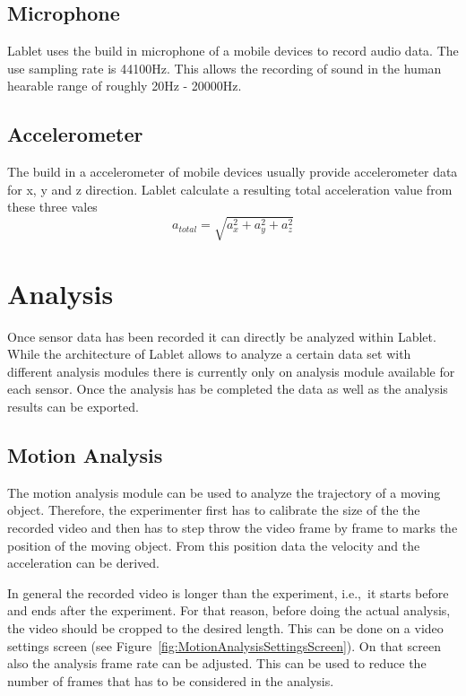 \documentclass{sigchi}
\newcommand{\ie}{i.e.,\ }
\begin{document}
\subsection{Microphone}
Lablet uses the build in microphone of a mobile devices to record audio data.
The use sampling rate is 44100Hz.
This allows the recording of sound in the human hearable range of roughly 20Hz - 20000Hz.

\subsection{Accelerometer}
The build in a accelerometer of mobile devices usually provide accelerometer data for x, y and z direction.
Lablet calculate a resulting total acceleration value from these three vales
\[
a_{total} = \sqrt{a_x^2 + a_y^2 + a_z^2}
\]

\section{Analysis}
Once sensor data has been recorded it can directly be analyzed within Lablet.
While the architecture of Lablet allows to analyze a certain data set with different analysis modules there is currently only on analysis module available for each sensor.
Once the analysis has be completed the data as well as the analysis results can be exported.

\subsection{Motion Analysis}
The motion analysis module can be used to analyze the trajectory of a moving object.
Therefore, the experimenter first has to calibrate the size of the the recorded video and then has to step throw the video frame by frame to marks the position of the moving object.
From this position data the velocity and the acceleration can be derived.

In general the recorded video is longer than the experiment, \ie it starts before and ends after the experiment.
For that reason, before doing the actual analysis, the video should be cropped to the desired length.
This can be done on a video settings screen (see Figure~\ref{fig:MotionAnalysisSettingsScreen}).
On that screen also the analysis frame rate can be adjusted.
This can be used to reduce the number of frames that has to be considered in the analysis.
\end{document}

